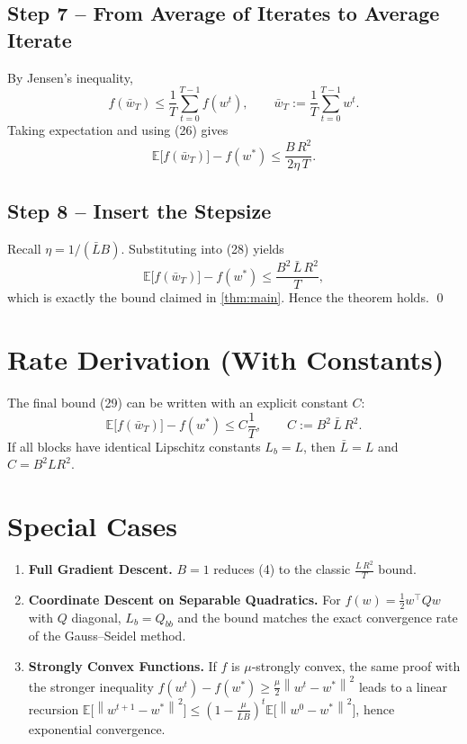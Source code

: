 \documentclass{article}
\newcommand{\E}{\mathbb{E}}
\newcommand{\norm}[1]{\left\lVert#1\right\rVert}
\begin{document}
\subsection*{Step 7 – From Average of Iterates to Average Iterate}
By Jensen’s inequality,
\[
f\!\left(\bar w_{T}\right)
\le \frac{1}{T}\sum_{t=0}^{T-1}f(w^{t}),
\qquad
\bar w_{T}:=\frac{1}{T}\sum_{t=0}^{T-1}w^{t}.
\tag{27}
\]
Taking expectation and using (26) gives
\[
\E\!\bigl[f(\bar w_{T})\bigr]-f(w^{*})
\le \frac{B\,R^{2}}{2\eta\,T}.
\tag{28}
\]

\subsection*{Step 8 – Insert the Stepsize}
Recall $\eta=1/(\bar L B)$.  Substituting into (28) yields
\[
\E\!\bigl[f(\bar w_{T})\bigr]-f(w^{*})
\le \frac{B^{2}\,\bar L\,R^{2}}{T},
\tag{29}
\]
which is exactly the bound claimed in \eqref{thm:main}.  Hence the theorem holds. \qed

\section*{Rate Derivation (With Constants)}
The final bound (29) can be written with an explicit constant $C$:
\[
\E\!\bigl[f(\bar w_{T})\bigr]-f(w^{*})\le
C\frac{1}{T},
\qquad C:=B^{2}\,\bar L\,R^{2}.
\]
If all blocks have identical Lipschitz constants $L_{b}=L$, then $\bar L=L$ and
$C=B^{2}LR^{2}$.

\section*{Special Cases}
\begin{enumerate}
\item \textbf{Full Gradient Descent.} $B=1$ reduces (4) to the classic
$\displaystyle\frac{L\,R^{2}}{T}$ bound.
\item \textbf{Coordinate Descent on Separable Quadratics.} For $f(w)=\frac12 w^{\top}Q w$ with $Q$ diagonal,
$L_{b}=Q_{bb}$ and the bound matches the exact convergence rate of the
Gauss–Seidel method.
\item \textbf{Strongly Convex Functions.} If $f$ is $\mu$‑strongly convex,
the same proof with the stronger inequality
$f(w^{t})-f(w^{*})\ge\frac{\mu}{2}\norm{w^{t}-w^{*}}^{2}$
leads to a linear recursion
$\E\!\bigl[\norm{w^{t+1}-w^{*}}^{2}\bigr]\le
\left(1-\frac{\mu}{\bar L B}\right)^{t}\E\!\bigl[\norm{w^{0}-w^{*}}^{2}\bigr]$,
hence exponential convergence.
\end{enumerate}
\end{document}
